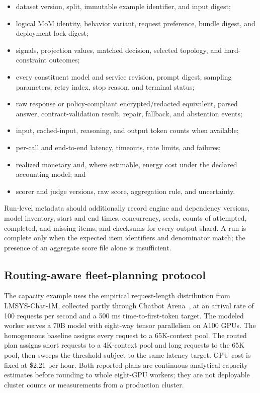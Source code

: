 \begin{itemize}
  \item dataset version, split, immutable example identifier, and input digest;
  \item logical MoM identity, behavior variant, request preference, bundle digest, and deployment-lock
  digest;
  \item signals, projection values, matched decision, selected topology, and
  hard-constraint outcomes;
  \item every constituent model and service revision, prompt digest, sampling
  parameters, retry index, stop reason, and terminal status;
  \item raw response or policy-compliant encrypted/redacted equivalent, parsed
  answer, contract-validation result, repair, fallback, and abstention events;
  \item input, cached-input, reasoning, and output token counts when available;
  \item per-call and end-to-end latency, timeouts, rate limits, and failures;
  \item realized monetary and, where estimable, energy cost under the declared
  accounting model;
  and
  \item scorer and judge versions, raw score, aggregation rule, and uncertainty.
\end{itemize}

Run-level metadata should additionally record engine and dependency versions,
model inventory, start and end times, concurrency, seeds, counts of attempted,
completed, and missing items, and checksums for every output shard. A run is complete
only when the expected item identifiers and denominator match; the presence of
an aggregate score file alone is insufficient.

\subsection{Routing-aware fleet-planning protocol}

The capacity example uses the empirical request-length distribution from
LMSYS-Chat-1M, collected partly through Chatbot
Arena~\citep{zheng_2023_lmsyschat,chiang_2024_chatbotarena}, at an arrival rate
of 100 requests per second and a 500 ms time-to-first-token target. The modeled
worker serves a 70B model with eight-way tensor parallelism on A100 GPUs. The
homogeneous baseline assigns every request to a 65K-context pool.  The routed
plan assigns short requests to a 4K-context pool and long requests to the 65K
pool, then sweeps the threshold subject to the same latency target.  GPU cost is
fixed at \$2.21 per hour.  Both reported plans are continuous analytical
capacity estimates before rounding to whole eight-GPU workers; they are not
deployable cluster counts or measurements from a production cluster.

